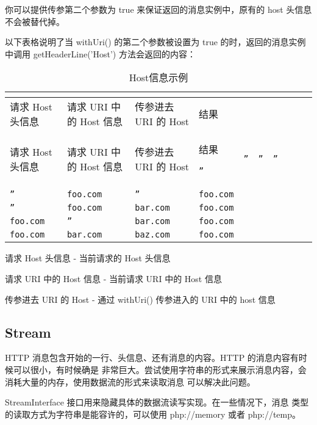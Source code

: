你可以提供传参第二个参数为 true 来保证返回的消息实例中，原有的 host 头信息不会被替代掉。

以下表格说明了当 withUri() 的第二个参数被设置为 true 的时，返回的消息实例中调用 getHeaderLine('Host') 方法会返回的内容：


\begin{longtable}{|m{60pt}|m{80pt}|m{80pt}|m{40pt}|}
\tabularnewline\hline
请求 Host 头信息&请求 URI 中的 Host 信息&	传参进去 URI 的 Host&	结果
\endhead

\caption{Host信息示例}\\
\hline
请求 Host 头信息&请求 URI 中的 Host 信息&	传参进去 URI 的 Host&	结果
\endfirsthead

\endfoot

\endlastfoot
\hline
\texttt{''}	&\texttt{''}&\texttt{''}&\texttt{''}\\
\hline
\texttt{''}	&\texttt{foo.com}	&\texttt{''}&\texttt{foo.com}\\
\hline
\texttt{''}	&\texttt{foo.com}	&\texttt{bar.com}	&\texttt{foo.com}\\
\hline
\texttt{foo.com}&\texttt{''}	&\texttt{bar.com}	&\texttt{foo.com}\\
\hline
\texttt{foo.com}&\texttt{bar.com}&\texttt{baz.com}&\texttt{foo.com}\\
\hline
\end{longtable}

\begin{compactitem}
\item 请求 Host 头信息 - 当前请求的 Host 头信息
\item 请求 URI 中的 Host 信息 - 当前请求 URI 中的 Host 信息
\item 传参进去 URI 的 Host - 通过 withUri() 传参进入的 URI 中的 host 信息
\end{compactitem}

\subsection{Stream}

HTTP 消息包含开始的一行、头信息、还有消息的内容。HTTP 的消息内容有时候可以很小，有时候确是 非常巨大。尝试使用字符串的形式来展示消息内容，会消耗大量的内存，使用数据流的形式来读取消息 可以解决此问题。

StreamInterface 接口用来隐藏具体的数据流读写实现。在一些情况下，消息 类型的读取方式为字符串是能容许的，可以使用 php://memory 或者 php://temp。

